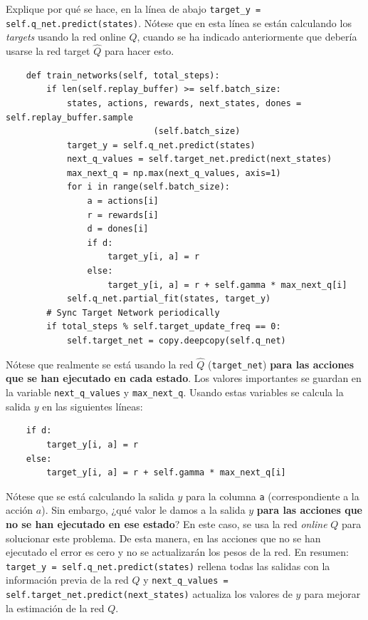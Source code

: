\documentclass{article}
\begin{document}
\begin{exercise}
    Explique por qué se hace, en la línea de abajo 
    \texttt{target\_y = self.q\_net.predict(states)}. Nótese que en esta línea se están calculando los \textit{targets} usando la red online $Q$, cuando se ha indicado anteriormente que debería usarse la red target $\hat{Q}$ para hacer esto.
    \begin{small}    
        \begin{verbatim}
    def train_networks(self, total_steps):
        if len(self.replay_buffer) >= self.batch_size:
            states, actions, rewards, next_states, dones = self.replay_buffer.sample
                             (self.batch_size)
            target_y = self.q_net.predict(states)
            next_q_values = self.target_net.predict(next_states)
            max_next_q = np.max(next_q_values, axis=1)
            for i in range(self.batch_size):
                a = actions[i]
                r = rewards[i]
                d = dones[i]
                if d:
                    target_y[i, a] = r
                else:
                    target_y[i, a] = r + self.gamma * max_next_q[i]
            self.q_net.partial_fit(states, target_y)
        # Sync Target Network periodically
        if total_steps % self.target_update_freq == 0:
            self.target_net = copy.deepcopy(self.q_net)
        \end{verbatim}
    \end{small}
\end{exercise}

Nótese que realmente se está usando la red $\hat{Q}$ (\texttt{target\_net}) \textbf{para las acciones que se han ejecutado en cada estado}. Los valores importantes se guardan en la variable \texttt{next\_q\_values} y \texttt{max\_next\_q}. Usando estas variables se calcula la salida $y$ en las siguientes líneas:
\begin{verbatim}
    if d:
        target_y[i, a] = r
    else:
        target_y[i, a] = r + self.gamma * max_next_q[i]
\end{verbatim}

Nótese que se está calculando la salida $y$ para la columna \texttt{a} (correspondiente a la acción $a$).
Sin embargo, ¿qué valor le damos a la salida $y$ \textbf{para las acciones que no se han ejecutado en ese estado}? En este caso, se usa la red \textit{online} $Q$ para solucionar este problema. De esta manera, en las acciones que no se han ejecutado el error es cero y no se actualizarán los pesos de la red. En resumen: \texttt{target\_y = self.q\_net.predict(states)} rellena todas las salidas con la información previa de la red $Q$ y \texttt{next\_q\_values = self.target\_net.predict(next\_states)} actualiza los valores de $y$ para mejorar la estimación de la red $Q$.
\end{document}
